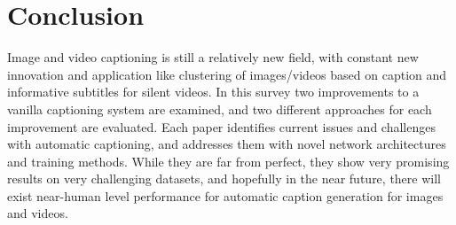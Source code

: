 \documentclass[12pt,onecolumn,letterpaper,draftclsnofoot]{article}
\begin{document}
\section{Conclusion}
Image and video captioning is still a relatively new field, with constant new
innovation and application like clustering of images/videos based on caption
and informative subtitles for silent videos. In this survey two improvements
to a vanilla captioning system are examined, and two different approaches for
each improvement are evaluated. Each paper identifies current issues and
challenges with automatic captioning, and addresses them with novel network
architectures and training methods. While they are far from perfect, they show
very promising results on very challenging datasets, and hopefully in the near
future, there will exist near-human level performance for automatic caption
generation for images and videos.

{\small


}
\end{document}
